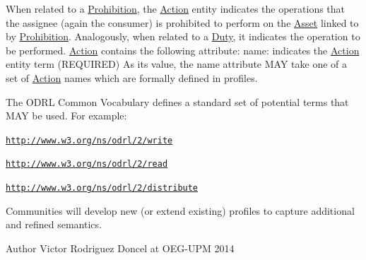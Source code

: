 When related to a \hyperlink{classodrlmodel_1_1_prohibition}{Prohibition}, the \hyperlink{classodrlmodel_1_1_action}{Action} entity indicates the operations that the assignee (again the consumer) is prohibited to perform on the \hyperlink{classodrlmodel_1_1_asset}{Asset} linked to by \hyperlink{classodrlmodel_1_1_prohibition}{Prohibition}. Analogously, when related to a \hyperlink{classodrlmodel_1_1_duty}{Duty}, it indicates the operation to be performed. \hyperlink{classodrlmodel_1_1_action}{Action} contains the following attribute\-: name\-: indicates the \hyperlink{classodrlmodel_1_1_action}{Action} entity term (R\-E\-Q\-U\-I\-R\-E\-D) As its value, the name attribute M\-A\-Y take one of a set of \hyperlink{classodrlmodel_1_1_action}{Action} names which are formally defined in profiles.

The O\-D\-R\-L Common Vocabulary defines a standard set of potential terms that M\-A\-Y be used. For example\-: 
\begin{DoxyItemize}
\item \href{http://www.w3.org/ns/odrl/2/write}{\tt http\-://www.\-w3.\-org/ns/odrl/2/write} 
\item \href{http://www.w3.org/ns/odrl/2/read}{\tt http\-://www.\-w3.\-org/ns/odrl/2/read} 
\item \href{http://www.w3.org/ns/odrl/2/distribute}{\tt http\-://www.\-w3.\-org/ns/odrl/2/distribute} 
\end{DoxyItemize}

Communities will develop new (or extend existing) profiles to capture additional and refined semantics. \begin{DoxyAuthor}{Author}
Victor Rodriguez Doncel at O\-E\-G-\/\-U\-P\-M 2014 
\end{DoxyAuthor}


